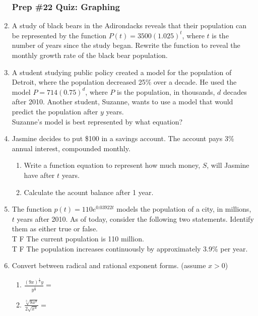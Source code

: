 \documentclass[12pt, twoside]{article}
\begin{document}
\begin{enumerate}[itemsep=0.5cm]
\newpage
\subsubsection*{Prep \#22 Quiz: Graphing}
\item A study of black bears in the Adirondacks reveals that their population can be represented by the function $P(t) = 3500(1.025)^t$, where $t$ is the number of years since the study began. Rewrite the function to reveal the monthly growth rate of the black bear population. %
\vspace{2cm}

\item A student studying public policy created a model for the population of Detroit, where the population decreased 25\% over a decade. He used the model $P = 714(0.75)^d$, where $P$ is the population, in thousands, $d$ decades after 2010. Another student, Suzanne, wants to use a model that would predict the population after $y$ years. \\[0.25cm]
Suzanne's model is best represented by what equation? \vspace{3cm}

\item Jasmine decides to put \$100 in a savings account. The account pays 3\% annual interest, compounded monthly. %
    \begin{enumerate}
        \item Write a function equation to represent how much money, $S$, will Jasmine have after $t$ years. \vspace{2cm}
        \item Calculate the acount balance after 1 year. \vspace{2cm}
    \end{enumerate}

\item The function $p(t) = 110e^{0.03922t}$ models the population of a city, in
millions, $t$ years after 2010. As of today, consider the following two
statements. Identify them as either true or false. \\[0.25cm]
T \; F \; The current population is 110 million. \\[0.25cm]
T \; F \; The population increases continuously by approximately
3.9\% per year. 

\newpage
\item Convert between radical and rational exponent forms. (assume $x > 0$)
    \begin{multicols}{2}
    \begin{enumerate}
        \item $\displaystyle \frac{(9x)^{\frac{1}{2}} y}{y^{\frac{1}{2}}} =$
        \item $\displaystyle \frac{\sqrt[3]{8x^8}}{2 \sqrt{x^4}} = $
    \end{enumerate}
    \end{multicols} \vspace{2cm}


\end{enumerate}
\end{document}
